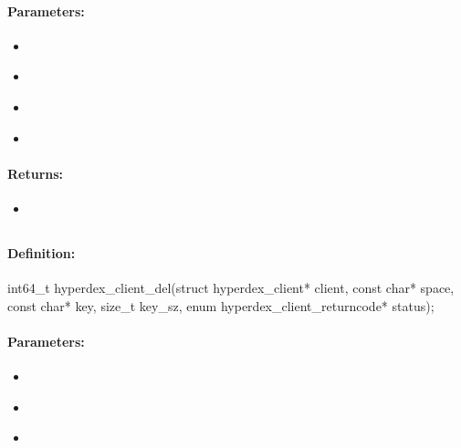 \paragraph{Parameters:}
\begin{itemize}[noitemsep]
\item {}\\

\item {}\\

\item {}\\

\item {}\\

\end{itemize}

\paragraph{Returns:}
\begin{itemize}[noitemsep]
\item {}\\

\end{itemize}

\pagebreak
\subsection{}
\label{api:c:del}


\paragraph{Definition:}
\begin{ccode}
int64_t hyperdex_client_del(struct hyperdex_client* client,
        const char* space,
        const char* key, size_t key_sz,
        enum hyperdex_client_returncode* status);
\end{ccode}

\paragraph{Parameters:}
\begin{itemize}[noitemsep]
\item {}\\

\item {}\\

\item {}\\

\end{itemize}

